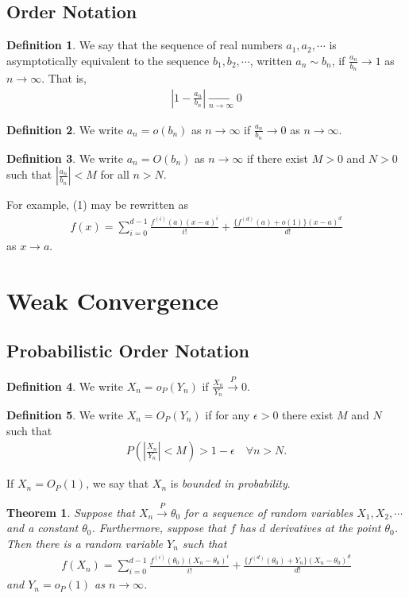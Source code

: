 \documentclass[12pt]{article}
\renewcommand{\=}[1]{\stackrel{#1}{=}} %
\newtheorem{thm}{Theorem}[section]
\theoremstyle{definition}
\newtheorem*{dfn}{Definition}
\begin{document}
	\subsection{Order Notation}
		\begin{dfn}
			We say that the sequence of real numbers $a_1,a_2,\cdots$ is asymptotically equivalent to the sequence $b_1,b_2,\cdots$, written $a_n\sim b_n$, if $\frac{a_n}{b_n}\rightarrow1$ as $n\rightarrow\infty$.
			That is,
			\begin{align}
			\left|1-\frac{a_n}{b_n}\right|\underset{n\rightarrow\infty}{\rightarrow}0
			\end{align}
		\end{dfn}
	\begin{dfn}
		We write $a_n=o(b_n)$ as $n\rightarrow\infty$ if $\frac{a_n}{b_n}\rightarrow0$ as $n\rightarrow\infty$.
	\end{dfn}
	\begin{dfn}
	We write $a_n=O(b_n)$ as $n\rightarrow\infty$ if there exist $M>0$ and $N>0$ such that $\left|\frac{a_n}{b_n}\right|<M$ for all $n>N$.
	\end{dfn}
	For example, (1) may be rewritten as
	\begin{align}
		f(x)=\sum_{i=0}^{d-1}\frac{f^{(i)}(a)(x-a)^i}{i!}+\frac{\{f^{(d)}(a)+o(1)\}(x-a)^d}{d!}
	\end{align}
	as $x\rightarrow a$.
	\section{Weak Convergence}
	\subsection{Probabilistic Order Notation}
		\begin{dfn}
			We write $X_n=o_P(Y_n)$ if $\frac{X_n}{Y_n}\overset{P}{\rightarrow}0$.
		\end{dfn}
		\begin{dfn}
			We write $X_n=O_P(Y_n)$ if for any $\epsilon>0$ there exist $M$ and $N$ such that
			\begin{align}
			P\left(\left|\frac{X_n}{Y_n}\right|<M\right)>1-\epsilon\quad\forall n>N.
			\end{align}
		\end{dfn}
		If $X_n=O_P(1)$, we say that $X_n$ is \textit{bounded in probability}.
	\begin{thm}
		Suppose that $X_n\overset{P}{\rightarrow}\theta_0$ for a sequence of random variables $X_1,X_2,\cdots$ and a constant $\theta_0$. Furthermore, suppose that $f$ has $d$ derivatives at the point $\theta_0$. Then there is a random variable $Y_n$ such that
		\begin{align}
			f(X_n)=\sum_{i=0}^{d-1}\frac{f^{(i)}(\theta_0)(X_n-\theta_0)^i}{i!}+\frac{\{f^{(d)}(\theta_0)+Y_n\}(X_n-\theta_0)^d}{d!}
		\end{align}
		and $Y_n=o_P(1)$ as $n\rightarrow\infty$.
	\end{thm}
\end{document}
